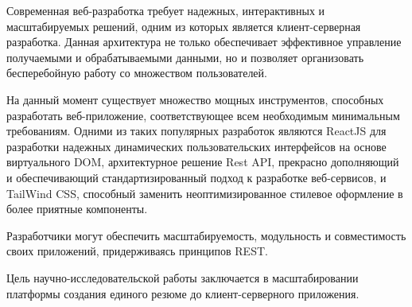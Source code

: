 \documentclass[master, och, pract]{SCWorks}
\begin{document}
\maketitle

\secNumbering

\tableofcontents









\intro
Современная веб-разработка требует надежных, интерактивных и масштабируемых решений, одним из которых является клиент-серверная разработка. Данная архитектура не только обеспечивает эффективное управление получаемыми и обрабатываемыми данными, но и позволяет организовать бесперебойную работу со множеством пользователей.

На данный момент существует множество мощных инструментов, способных разработать веб-приложение, соответствующее всем необходимым минимальным требованиям. Одними из таких популярных разработок являются ReactJS для разработки надежных динамических пользовательских интерфейсов на основе виртуального DOM, архитектурное решение Rest API, прекрасно дополняющий и обеспечивающий стандартизированный подход к разработке веб-сервисов, и TailWind CSS, способный заменить неоптимизированное стилевое оформление в более приятные компоненты.

Разработчики могут обеспечить масштабируемость, модульность и совместимость своих приложений, придерживаясь принципов REST. 

Цель научно-исследовательской работы заключается в масштабировании платформы создания единого резюме до клиент-серверного приложения.
\end{document}
